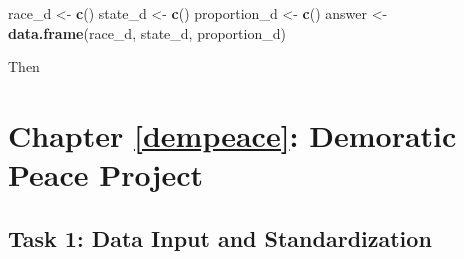 \documentclass[]{book}
\newenvironment{Shaded}{\begin{snugshade}}{\end{snugshade}}
\newcommand{\ControlFlowTok}[1]{\textcolor[rgb]{0.13,0.29,0.53}{\textbf{#1}}}
\newcommand{\DataTypeTok}[1]{\textcolor[rgb]{0.13,0.29,0.53}{#1}}
\newcommand{\DecValTok}[1]{\textcolor[rgb]{0.00,0.00,0.81}{#1}}
\newcommand{\KeywordTok}[1]{\textcolor[rgb]{0.13,0.29,0.53}{\textbf{#1}}}
\newcommand{\NormalTok}[1]{#1}
\newcommand{\OperatorTok}[1]{\textcolor[rgb]{0.81,0.36,0.00}{\textbf{#1}}}
\newcommand{\StringTok}[1]{\textcolor[rgb]{0.31,0.60,0.02}{#1}}
\theoremstyle{definition}
\theoremstyle{definition}
\theoremstyle{definition}
\theoremstyle{remark}
\begin{document}
\begin{Shaded}
\begin{Highlighting}[]
\begin{Shaded}
\begin{Highlighting}[]
\begin{Shaded}
\begin{Highlighting}[]
\begin{Shaded}
\begin{Highlighting}[]
\NormalTok{race_d <-}\StringTok{ }\KeywordTok{c}\NormalTok{()}
\NormalTok{state_d <-}\StringTok{ }\KeywordTok{c}\NormalTok{()}
\NormalTok{proportion_d <-}\StringTok{ }\KeywordTok{c}\NormalTok{()}
\NormalTok{answer <-}\StringTok{ }\KeywordTok{data.frame}\NormalTok{(race_d, state_d, proportion_d)}
\end{Highlighting}
\end{Shaded}

Then

\begin{Shaded}
\end{Shaded}

\hypertarget{chapter-refdempeace-demoratic-peace-project}{%
\section{Chapter \ref{dempeace}: Demoratic Peace Project}\label{chapter-refdempeace-demoratic-peace-project}}

\hypertarget{task-1-data-input-and-standardization-1}{%
\subsection*{Task 1: Data Input and Standardization}\label{task-1-data-input-and-standardization-1}}


\end{Highlighting}
\end{Shaded}
\end{Highlighting}
\end{Shaded}
\end{Highlighting}
\end{Shaded}
\end{document}
